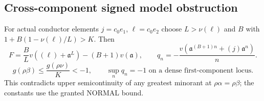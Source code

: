 \subsection*{Cross-component signed model obstruction}
For actual conductor elements $j=c_0e_1$, $\ell=c_0e_2$ choose
$L>\nu(\ell)$ and $B$ with $1+B(1-\nu(\ell)/L)>K$. Then
\[
 F=\frac BLv((\ell)+\mathfrak a^L)-(B+1)v(\mathfrak a),\qquad
 q_n=-\frac{v(\mathfrak a^{(B+1)n}+(j)\mathfrak a^n)}n.
\]
\[
 g(\rho\beta)\le\frac{g(\rho\nu)}K<-1,\qquad
 \sup_n q_n=-1\text{ on a dense first-component locus}.
\]
This contradicts upper semicontinuity of any greatest minorant at
$\rho\alpha=\rho\beta$; the constants use the granted NORMAL bound.

